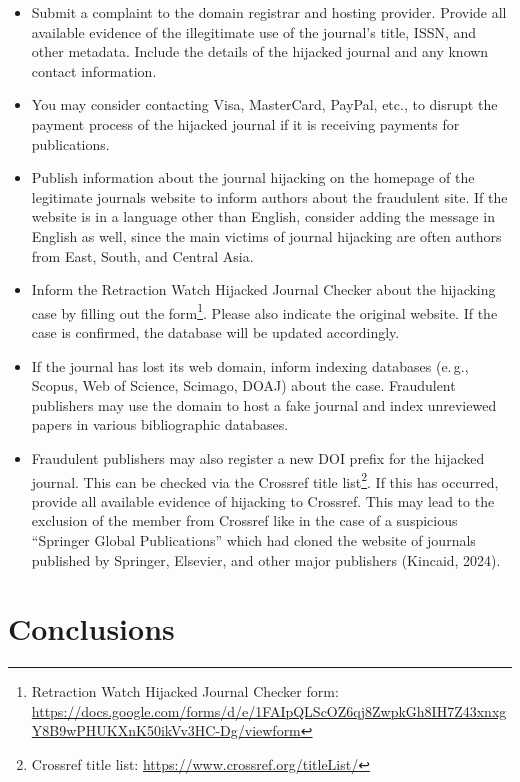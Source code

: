\documentclass[a4paper,
fontsize=11pt,
oneside,
numbers=noperiodatend,
parskip=half-,
bibliography=totoc,
final
]{scrartcl}
\begin{document}
\begin{itemize}
\item
  Submit a complaint to the domain registrar and hosting provider.
  Provide all available evidence of the illegitimate use of the
  journal's title, ISSN, and other metadata. Include the details of the
  hijacked journal and any known contact information.
\item
  You may consider contacting Visa, MasterCard, PayPal, etc., to disrupt
  the payment process of the hijacked journal if it is receiving
  payments for publications.
\item
  Publish information about the journal hijacking on the homepage of the
  legitimate journal\textquotesingle s website to inform authors about
  the fraudulent site. If the website is in a language other than
  English, consider adding the message in English as well, since the
  main victims of journal hijacking are often authors from East, South,
  and Central Asia.
\item
  Inform the Retraction Watch Hijacked Journal Checker about the
  hijacking case by filling out the form\footnote{Retraction Watch
    Hijacked Journal Checker form:
    \url{https://docs.google.com/forms/d/e/1FAIpQLScOZ6qj8ZwpkGh8IH7Z43xnxgY8B9wPHUKXnK50ikVv3HC-Dg/viewform}}.
  Please also indicate the original website. If the case is confirmed,
  the database will be updated accordingly.
\item
  If the journal has lost its web domain, inform indexing databases (e.\,g., Scopus, Web of Science, Scimago, DOAJ) about the case. Fraudulent
  publishers may use the domain to host a fake journal and index
  unreviewed papers in various bibliographic databases.
\item
  Fraudulent publishers may also register a new DOI prefix for the
  hijacked journal. This can be checked via the Crossref title
  list\footnote{Crossref title list:
    \url{https://www.crossref.org/titleList/}}. If this has occurred,
  provide all available evidence of hijacking to Crossref. This may lead
  to the exclusion of the member from Crossref like in the case of a
  suspicious \enquote{Springer Global Publications} which had cloned the
  website of journals published by Springer, Elsevier, and other major
  publishers (Kincaid, 2024).
\end{itemize}

\section{Conclusions}\label{conclusions}
\end{document}
